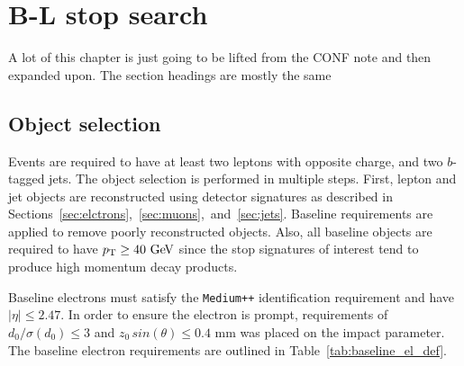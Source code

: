 \chapter[B-L stop search][B-L stop search]{B-L stop search}
\label{ch:bl_stop}

{\color{red}A lot of this chapter is just going to be lifted from the CONF note
  and then expanded upon. The section headings are mostly the same}

\section{Object selection}
\label{sec:object_selection}

Events are required to have at least two leptons with opposite charge, and two
$b$-tagged jets.
The object selection is performed in multiple steps. First, lepton and jet
objects are reconstructed using detector signatures as described in
Sections~\ref{sec:elctrons},~\ref{sec:muons},~and~\ref{sec:jets}.
Baseline requirements are applied to remove poorly reconstructed objects.
Also, all baseline objects are required to have $\pt \geq 40 \GeV$ since the
stop signatures of interest tend to produce high momentum decay products.

Baseline electrons must satisfy the \texttt{Medium++} identification
requirement and have $|\eta| \leq 2.47$.
In order to ensure the electron is prompt, requirements of 
$d_0/\sigma(d_0) \leq 3$ and $z_0\,sin(\theta) \leq 0.4$ mm was placed on the
impact parameter. The baseline electron requirements are outlined in
Table~\ref{tab:baseline_el_def}.

\begin{table}[ht]
\caption{Baseline electron requirements.}
\label{tab:baseline_el_def}
\end{table}


